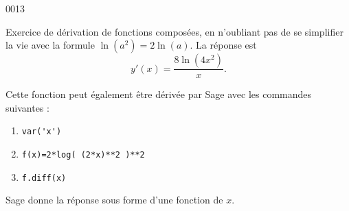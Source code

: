 \begin{corrige}{0013}

Exercice de dérivation de fonctions composées, en n'oubliant pas de se simplifier la vie avec la formule $\ln(a^2)=2\ln(a)$. La réponse est
\begin{equation}
	y'(x)=\frac{ 8\ln(4x^2) }{ x }.
\end{equation}

Cette fonction peut également être dérivée par Sage avec les commandes suivantes :
\begin{enumerate}

	\item
		\verb+var('x')+
	\item
		\verb+f(x)=2*log( (2*x)**2 )**2+
	\item
		\verb+f.diff(x)+

\end{enumerate}
Sage donne la réponse sous forme d'une fonction de $x$.

\end{corrige}
